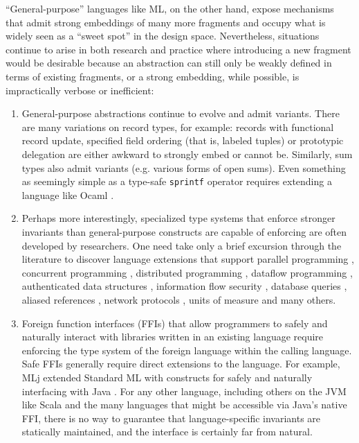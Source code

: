\documentclass[9pt,preprint]{sigplanconf}
\begin{document}
``General-purpose'' languages like ML, on the other hand, expose mechanisms that admit strong embeddings of many more fragments and occupy what is widely seen as a ``sweet spot'' in the design space. Nevertheless, situations continue to arise in both research and practice where introducing a new fragment would be desirable because an abstraction can still only be weakly defined in terms of existing fragments, or a strong embedding, while possible, is impractically verbose or inefficient:
\begin{enumerate}
\item General-purpose abstractions continue to evolve and admit variants. There are many  variations on record types, for example: records with functional record update, specified field ordering (that is, labeled tuples) or prototypic delegation are either awkward to strongly embed or cannot be. Similarly, sum types also admit variants (e.g. various forms of open sums). Even something as seemingly simple as a type-safe \verb|sprintf| operator requires extending a language like Ocaml  \cite{ocaml-printf}.

\item Perhaps more interestingly, specialized type systems that enforce stronger invariants than general-purpose constructs are capable of enforcing are often developed by researchers. One need take only a brief  excursion through the literature to discover language extensions that support parallel programming \cite{a}, concurrent programming \cite{cml}, distributed programming \cite{tom7}, dataflow programming \cite{reactiveml}, authenticated data structures \cite{popl13}, information flow security \cite{walker00, smith2001}, database queries \cite{db}, aliased references \cite{naden12}, network protocols \cite{sekar99}, units of measure \cite{keneddy} and many others.%
\item Foreign function interfaces (FFIs) that allow programmers to safely and naturally interact with libraries written in an existing language require enforcing the type system of the foreign language within the calling language. %
Safe FFIs generally require direct extensions to the language. For example, MLj extended Standard ML with constructs for safely and naturally interfacing with Java \cite{mlj}. For any other language, including  others on the JVM like Scala and the many languages that might be accessible via Java's native FFI, there is no way to guarantee that language-specific invariants are statically maintained, and the interface is certainly far from natural.
\end{enumerate}
\end{document}
